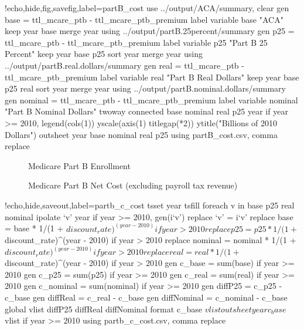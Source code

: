 \documentclass{article}
\begin{document}
\begin{Statacode}{!echo,hide,fig,savefig,label=partB_cost}
use ../output/ACA/summary, clear
gen base = ttl_mcare_ptb - ttl_mcare_ptb_premium
label variable base "ACA"
keep year base
merge year using ../output/partB.25percent/summary
gen p25 = ttl_mcare_ptb - ttl_mcare_ptb_premium
label variable p25 "Part B 25 Percent"
keep year base p25
sort year
merge year using ../output/partB.real.dollars/summary
gen real = ttl_mcare_ptb - ttl_mcare_ptb_premium
label variable real "Part B Real Dollars"
keep year base p25 real
sort year
merge year using ../output/partB.nominal.dollars/summary
gen nominal = ttl_mcare_ptb - ttl_mcare_ptb_premium
label variable nominal "Part B Nominal Dollars"
twoway connected base nominal real p25 year if year >= 2010, legend(cols(1)) yscale(axis(1) titlegap(*2)) ytitle("Billions of 2010 Dollars")
outsheet year base nominal real p25 using partB_cost.csv, comma replace
\end{Statacode}

\begin{figure}[ht]
\centering
{}
\caption{Medicare Part B Enrollment}
\label{fig:partB_enrollment}
\end{figure}

\begin{figure}[ht]
\centering
{}
\caption{Medicare Part B Net Cost (excluding payroll tax revenue)}
\label{fig:partB_cost}
\end{figure}

\begin{Statacode}{!echo,hide,saveout,label=partb_c_cost}
tsset year
tsfill
foreach v in base p25 real nominal {
  ipolate `v' year if year >= 2010, gen(i`v')
  replace `v' = i`v'
}
replace base = base * 1/(1 + $discount_rate)^(year - 2010) if year > 2010
replace p25 = p25 * 1/(1 + $discount_rate)^(year - 2010) if year > 2010
replace nominal = nominal * 1/(1 + $discount_rate)^(year - 2010) if year > 2010
replace real = real * 1/(1 + $discount_rate)^(year - 2010) if year > 2010
gen c_base = sum(base)  if year >= 2010
gen c_p25 = sum(p25) if year >= 2010
gen c_real = sum(real) if year >= 2010
gen c_nominal = sum(nominal) if year >= 2010
gen diffP25 = c_p25 - c_base
gen diffReal = c_real - c_base
gen diffNominal = c_nominal - c_base
global vlist diffP25 diffReal diffNominal
format c_base $vlist %
outsheet year c_base $vlist if year >= 2010 using partb_c_cost.csv, comma replace
\end{Statacode}
\end{document}
